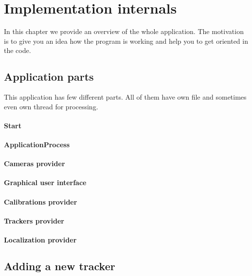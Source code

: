 \chapter{Implementation internals}

In this chapter we provide an overview of the whole application. The motivation
is to give you an idea how the program is working and help you to get oriented
in the code.

\section{Application parts}
This application has few different parts. All of them have own file and
sometimes even own thread for processing.

\subsubsection*{Start}

\subsubsection*{ApplicationProcess}

\subsubsection*{Cameras provider}

\subsubsection*{Graphical user interface}

\subsubsection*{Calibrations provider}

\subsubsection*{Trackers provider}

\subsubsection*{Localization provider}

\section{Adding a new tracker}

